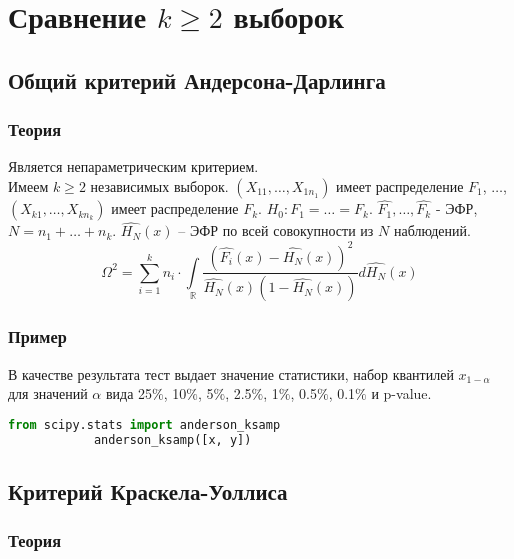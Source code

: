 \section{Сравнение $k \ge 2$ выборок}\label{cha:uniform/sec:k}

	\subsection{Общий критерий Андерсона-Дарлинга}\label{cha:uniform/sec:k/andersdarling}

		\subsubsection*{Теория}\label{cha:uniform/sec:k/subsec:andersdarling/subsubsec:theory}

		Является непараметрическим критерием.\\

		Имеем $k \ge 2$ независимых выборок. $(X_{11}, \dots, X_{1 n_1})$ имеет распределение $F_1$, $\dots$, $(X_{k1}, \dots, X_{k n_k})$ имеет распределение $F_k$. $H_0: F_1 = \dots = F_k$. $\hat{F_1}, \dots, \hat{F_k}$ - ЭФР, $N = n_1 + \dots + n_k$. $\hat{H_N}(x)$ -- ЭФР по всей совокупности из $N$ наблюдений.
		$$\Omega^2 = \underset{i=1}{\overset{k}{\sum}}n_i \cdot \underset{\mathbb{R}}{\overset{}{\int}}\frac{\left( \hat{F_i}(x) - \hat{H_N}(x) \right)^2}{\hat{H_N}(x) (1 - \hat{H_N}(x))} d \hat{H_N}(x)$$ 

		\subsubsection*{Пример}\label{cha:uniform/sec:k/subsec:andersdarling/subsubsec:prob}

		В качестве результата тест выдает значение статистики, набор квантилей $x_{1-\alpha}$ для значений $\alpha$ вида 25$\%$, 10$\%$, 5$\%$, 2.5$\%$, 1$\%$, 0.5$\%$, 0.1$\%$ и p-value.

		\begin{lstlisting}[language=Python]
			from scipy.stats import anderson_ksamp
			anderson_ksamp([x, y])
		\end{lstlisting}

	\subsection{Критерий Краскела-Уоллиса}\label{cha:uniform/sec:k/kraskel}

		\subsubsection*{Теория}\label{cha:uniform/sec:k/subsec:kraskel/subsubsec:theory}

